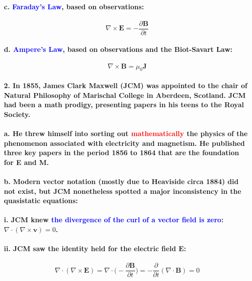 \documentclass{article}
\begin{document}
\paragraph{\indent c. \textcolor{blue}{Faraday's Law}, based on observations:}
\begin{equation*}
    \nabla\times\boldsymbol{E}=-\frac{\partial\boldsymbol{B}}{\partial t}
\end{equation*}
\paragraph{\indent d. \textcolor{blue}{Ampere's Law}, based on observations and the Biot-Savart Law:}
\begin{equation*}
    \nabla\times\boldsymbol{B}=\mu_0\boldsymbol{J}
\end{equation*}
\paragraph{2. In 1855, James Clark Maxwell (JCM) was appointed to the chair of Natural Philosophy of Marischal College in Aberdeen, Scotland. JCM had been a math prodigy, presenting papers in his teens to the Royal Society.}
\paragraph{\indent a. He threw himself into sorting out \textcolor{red}{mathematically} the physics of the phenomenon associated with electricity and magnetism. He published three key papers in the period 1856 to 1864 that are the foundation for E and M.}
\paragraph{\indent b. Modern vector notation (mostly due to Heaviside circa 1884) did not exist, but JCM nonetheless spotted a major inconsistency in the quasistatic equations:}
\paragraph{\indent\indent i. JCM knew \textcolor{blue}{the divergence of the curl of a vector field is zero}: $\nabla\cdot(\nabla\times\boldsymbol{v})=0$.}
\paragraph{\indent\indent ii. JCM saw the identity held for the electric field $\boldsymbol{E}$:}
\begin{equation*}
    \nabla\cdot(\nabla\times\boldsymbol{E})=\nabla\cdot\bigg(-\frac{\partial\boldsymbol{B}}{\partial t}\bigg)=-\frac{\partial}{\partial t}(\nabla\cdot\boldsymbol{B})=0
\end{equation*}
\end{document}
